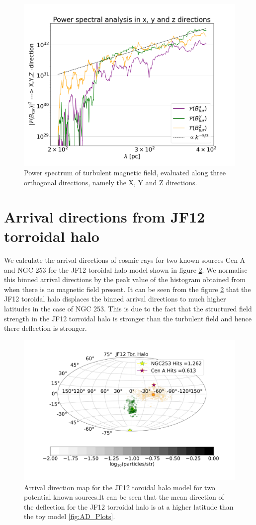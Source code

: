 \documentclass[usenatbib]{mnras}
\begin{document}
\begin{figure}
    \includegraphics[width = 0.49\linewidth]{Images/Jan27_Test_PowerSpectrum_vs_lambda_seed_10_lmin_200.0lmax_400.0.png}
    \caption{Power spectrum of turbulent magnetic field, evaluated along three orthogonal directions, namely the X, Y and Z directions.}
    \label{fig:PowerSpectrum}
\end{figure}
\section{Arrival directions from JF12 torroidal halo}
\label{Appendix_C}
We calculate the arrival directions of cosmic rays for two known sources Cen A and NGC 253 for the JF12 toroidal halo model \cite{JF12} shown in figure \ref{JF12_AD}. We normalise this binned arrival directions by the peak value of the histogram obtained from when there is no magnetic field present. It can be seen from the figure \ref{JF12_AD} that the JF12 toroidal halo displaces the binned arrival directions to much higher latitudes in the case of NGC 253. This is due to the fact that the structured field strength in the JF12 torroidal halo is stronger than the turbulent field and hence there deflection is stronger. 
\begin{figure}
\centering
\includegraphics[width=0.60\linewidth]{Images/Bins_180_CenA_NGC253_JF12_Halo_40_EeV.png}
 \caption{Arrival direction map for the JF12 toroidal halo model for two potential known sources.It can be seen that the mean direction of the deflection for the JF12 torroidal halo is at a higher latitude than the toy model \ref{fig:AD_Plots}.}
\label{JF12_AD}
\end{figure}
\end{document}
